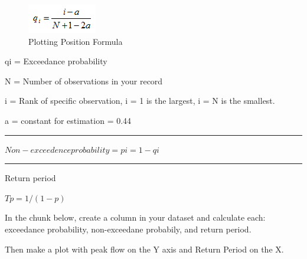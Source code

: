 \documentclass[
]{book}
\newenvironment{Shaded}{\begin{snugshade}}{\end{snugshade}}
\newcommand{\AttributeTok}[1]{\textcolor[rgb]{0.77,0.63,0.00}{#1}}
\newcommand{\CommentTok}[1]{\textcolor[rgb]{0.56,0.35,0.01}{\textit{#1}}}
\newcommand{\DecValTok}[1]{\textcolor[rgb]{0.00,0.00,0.81}{#1}}
\newcommand{\FloatTok}[1]{\textcolor[rgb]{0.00,0.00,0.81}{#1}}
\newcommand{\FunctionTok}[1]{\textcolor[rgb]{0.00,0.00,0.00}{#1}}
\newcommand{\NormalTok}[1]{#1}
\newcommand{\OtherTok}[1]{\textcolor[rgb]{0.56,0.35,0.01}{#1}}
\newcommand{\SpecialCharTok}[1]{\textcolor[rgb]{0.00,0.00,0.00}{#1}}
\begin{document}
\begin{figure}
\centering
\includegraphics{images/plottingposition.png}
\caption{Plotting Position Formula}
\end{figure}

qi = Exceedance probability

N = Number of observations in your record

i = Rank of specific observation, i = 1 is the largest, i = N is the smallest.

a = constant for estimation = 0.44

\begin{center}\rule{0.5\linewidth}{0.5pt}\end{center}

\(Non-exceedence probability = pi = 1 - qi\)

\begin{center}\rule{0.5\linewidth}{0.5pt}\end{center}

Return period

\(Tp = 1/(1-p)\)

In the chunk below, create a column in your dataset and calculate each: exceedance probability, non-exceedane probabily, and return period.

Then make a plot with peak flow on the Y axis and Return Period on the X.

\begin{Shaded}
\end{Shaded}
\end{document}

